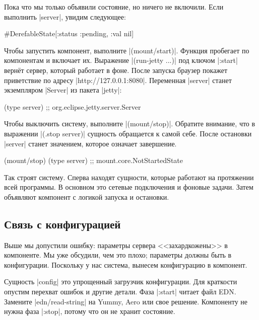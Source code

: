 Пока что мы только объявили состояние, но ничего не включили. Если выполнить
\spverb|server|, увидим следующее:

\begin{english}
  \begin{clojure}
#DerefableState[{:status :pending, :val nil}]
  \end{clojure}
\end{english}

Чтобы запустить компонент, выполните \spverb|(mount/start)|. Функция пробегает
по компонентам и включает их. Выражение \spverb|(run-jetty ...)| под ключом
\spverb|:start| верн\"{е}т сервер, который работает в фоне. После запуска браузер
покажет приветствие по адресу \spverb|http://127.0.0.1:8080|. Переменная
\spverb|server| станет экземпляром \spverb|Server| из пакета \spverb|jetty|:

\begin{english}
  \begin{clojure}
(type server)
;; org.eclipse.jetty.server.Server
  \end{clojure}
\end{english}

Чтобы выключить систему, выполните \spverb|(mount/stop)|. Обратите внимание, что
в выражении \spverb|(.stop server)| сущность обращается к самой себе. После
остановки \spverb|server| станет значением, которое означает завершение.

\begin{english}
  \begin{clojure}
(mount/stop)
(type server)
;; mount.core.NotStartedState
  \end{clojure}
\end{english}

Так строят систему. Сперва находят сущности, которые работают на протяжении всей
программы. В основном это сетевые подключения и фоновые задачи. Затем объявляют
компонент с логикой запуска и остановки.

\subsection{Связь с конфигурацией}

Выше мы допустили ошибку: параметры сервера <<захардкожены>> в компоненте. Мы
уже обсудили, чем это плохо; параметры должны быть в конфигурации. Поскольку у
нас система, вынесем конфигурацию в компонент.


Сущность \spverb|config| это упрощенный загрузчик конфигурации. Для краткости
опустим перехват ошибок и другие детали. Фаза \spverb|:start| читает файл
EDN. Замените \spverb|edn/read-string| на Yummy, Aero или свое
решение. Компоненту не нужна фаза \spverb|:stop|, потому что он не хранит
состояние.

